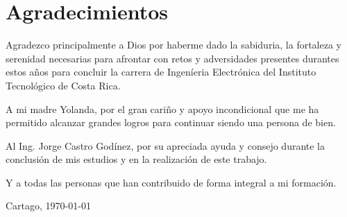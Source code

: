 \chapter*{Agradecimientos}
\thispagestyle{empty}

Agradezco principalmente a Dios por haberme dado la sabiduria, la fortaleza y serenidad necesarias para afrontar con retos y adversidades presentes durantes estos años para concluir la carrera de Ingeníeria Electrónica del Instituto Tecnológico de Costa Rica.

A mi madre Yolanda, por el gran cariño y apoyo incondicional que me ha permitido alcanzar grandes logros para continuar siendo una persona de bien.

Al Ing. Jorge Castro Godínez, por su apreciada ayuda y consejo durante la conclusión de mis estudios y en la realización de este trabajo.

Y a todas las personas que han contribuido de forma integral a mi formación.
\vspace*{1cm}

\scriptAuthor

Cartago, \today

\cleardoublepage

